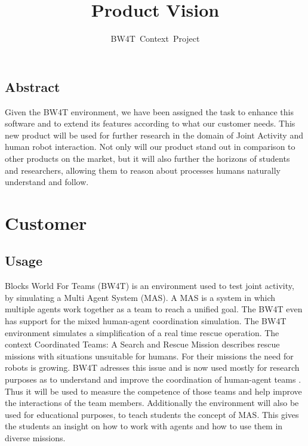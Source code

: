 \documentclass[oneside]{tudelft-report}
\begin{document}
\frontmatter

\title[Blocks World for Teams]{Product Vision}
\author{BW4T~Context~Project}
\makecover

\mainmatter	


\pagebreak
\section*{Abstract}
Given the BW4T environment, we have been assigned the task to enhance this software and to extend its features according to what our customer needs. This new product will be used for further research in the domain of Joint Activity and human robot interaction. Not only will our product stand out in comparison to other products on the market, but it will also further the horizons of students and researchers, allowing them to reason about processes humans naturally understand and follow.


\pagebreak
\tableofcontents
\pagebreak

\chapter{Customer}

\section{Usage}
Blocks World For Teams (BW4T) \cite{bw4t} is an environment used to test joint activity, by simulating a Multi Agent System (MAS). A MAS is a system in which multiple agents work together as a team to reach a unified goal. The BW4T even has support for the mixed human-agent coordination simulation. The BW4T environment simulates a simplification of a real time rescue operation. The context Coordinated Teams: A Search and Rescue Mission \cite{context} describes rescue missions with situations unsuitable for humans. For their missions the need for robots is growing. BW4T adresses this issue and is now used mostly for research purposes as to understand and improve the coordination of human-agent teams \cite{humanagent}. Thus it will be used to measure the competence of those teams and help improve the interactions of the team members. Additionally the environment will also be used for educational purposes, to teach students the concept of MAS. This gives the students an insight on how to work with agents and how to use them in diverse missions.
\end{document}

